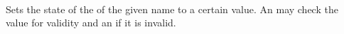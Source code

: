  \\

Sets the state of the  of the given name to a certain value. An  may check the value for validity and  an  if it is invalid. \\





